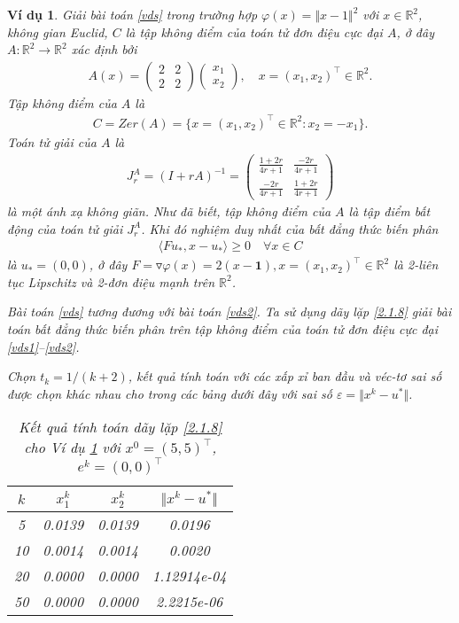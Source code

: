\documentclass[14pt, oneside,A4paper]{book}
\theoremstyle{plain}
\newtheorem{vd}[theorem]{\bf Ví dụ}
\begin{document}
\begin{vd}\label{vd1}\rm Giải bài toán \eqref{vds} trong trường hợp $\varphi (x) = \Vert x-1 \Vert^{2}$ với $ x \in \mathbb R^2$, không gian Euclid, $C$ là tập không điểm của toán tử đơn điệu cực đại $A$, ở đây $A:\mathbb R^{2} \rightarrow \mathbb R^{2}$ xác định bởi
\begin{align*}
A(x)= \begin{pmatrix}
2 & 2\\ 
2 & 2
\end{pmatrix}
\begin{pmatrix}
x_{1}\\x_{2} 
\end{pmatrix}, \quad x=(x_{1},x_{2})^{\top} \in \mathbb R^{2}.
\end{align*}
 Tập không điểm của $A$ là
\begin{align}\label{vds1}
C= Zer(A) = \lbrace x=(x_{1},x_{2})^{\top} \in \mathbb R^{2}:x_{2} = -x_{1} \rbrace.
\end{align}
Toán tử giải của $A$ là 
\begin{align*}
J_{r}^{A}=(I+rA)^{-1}=\begin{pmatrix}
\frac{1+2r}{4r+1} & \frac{-2r}{4r+1}\\ 
\frac{-2r}{4r+1} & \frac{1+2r}{4r+1}
\end{pmatrix}
\end{align*}
là một ánh xạ không giãn. Như đã biết, tập không điểm của $A$ là tập điểm bất động của toán tử giải $J_{r}^{A}$. Khi đó nghiệm duy nhất của bất đẳng thức biến phân
\begin{align}\label{vds2}
\langle Fu_{*},x-u_{*} \rangle \geq 0 \quad \forall x \in C
\end{align}
là $u_{*}=(0,0)$, ở đây $F=\triangledown \varphi (x)= 2(x-\textbf{1}), x=(x_{1},x_{2})^{\top} \in \mathbb R^{2}$ là 2-liên tục Lipschitz và 2-đơn điệu mạnh trên $\mathbb R^{2}$.

Bài toán \eqref{vds} tương đương với bài toán \eqref{vds2}. Ta sử dụng dãy lặp \eqref{2.1.8} giải bài toán bất đẳng thức biến phân trên tập không điểm của toán tử đơn điệu cực đại \eqref{vds1}--\eqref{vds2}. 

Chọn $t_k = 1/(k+2)$, kết quả tính toán với các xấp xỉ ban đầu  và véc-tơ sai số  được chọn khác nhau cho trong các bảng dưới đây với sai số $\varepsilon=\Vert x^k-u^*\Vert $.
\\
\begin{table}[ht]
	\centering
	\begin{tabular}{|c|c|c|c|}			
\hline 
$k$ & $x_1^k$ & $x_2^k$ & $\Vert x^ {k}- u^{*} \Vert$\\ 
\hline 
5 & 0.0139 & 0.0139 & 0.0196 \\ 
\hline 
10 & 0.0014 & 0.0014 & 0.0020 \\ 
\hline 
20 & 0.0000 & 0.0000 & 1.12914e-04 \\ 
\hline 
50 & 0.0000 & 0.0000 & 2.2215e-06\\
\hline
\end{tabular}
\caption{Kết quả tính toán dãy lặp \eqref{2.1.8} cho Ví dụ \ref{vd1} với $x^0= (5, 5)^\top $, $e^{k}=(0,0)^\top$}
\label{B21}
	\end{table}


\end{vd}
\end{document}
